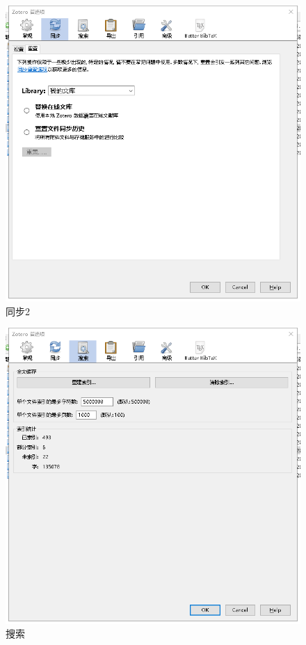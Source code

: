 \begin{figure}
	\centering
	\includegraphics[scale=0.8]{Fig/zotero3.png}
	\caption{\label{op3}同步2}
\end{figure}
\begin{figure}
	\centering
	\includegraphics[scale=0.8]{Fig/zotero4.png}
	\caption{\label{op4}搜索}
\end{figure}
